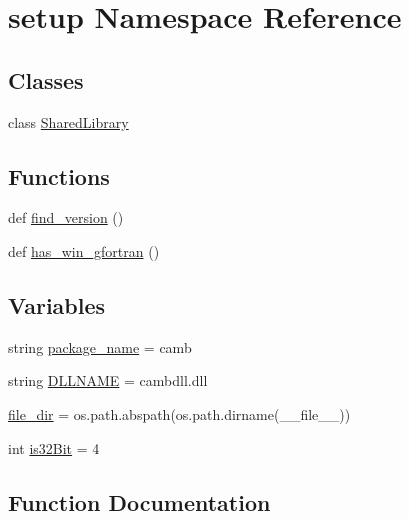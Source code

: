\hypertarget{namespacesetup}{}\section{setup Namespace Reference}
\label{namespacesetup}
\subsection*{Classes}
\begin{DoxyCompactItemize}
\item 
class \mbox{\hyperlink{classsetup_1_1SharedLibrary}{Shared\+Library}}
\end{DoxyCompactItemize}
\subsection*{Functions}
\begin{DoxyCompactItemize}
\item 
def \mbox{\hyperlink{namespacesetup_a81fe34e138f28e550cb579b246bc735e}{find\+\_\+version}} ()
\item 
def \mbox{\hyperlink{namespacesetup_a44ec38f1dccfde84284d2f0ceaa35b69}{has\+\_\+win\+\_\+gfortran}} ()
\end{DoxyCompactItemize}
\subsection*{Variables}
\begin{DoxyCompactItemize}
\item 
string \mbox{\hyperlink{namespacesetup_a3c783d982ab5a3d08b5fcf646a62976d}{package\+\_\+name}} = \textquotesingle{}camb\textquotesingle{}
\item 
string \mbox{\hyperlink{namespacesetup_a26dab225a05128c68178dbb0c6c25d97}{D\+L\+L\+N\+A\+ME}} = \textquotesingle{}cambdll.\+dll\textquotesingle{}
\item 
\mbox{\hyperlink{namespacesetup_ab2a15eb5c273cfb43c44744feeaaf9aa}{file\+\_\+dir}} = os.\+path.\+abspath(os.\+path.\+dirname(\+\_\+\+\_\+file\+\_\+\+\_\+))
\item 
int \mbox{\hyperlink{namespacesetup_a8f95d44fb8dbfbf41cea9ce01742c708}{is32\+Bit}} = 4
\end{DoxyCompactItemize}


\subsection{Function Documentation}
\mbox{\label{namespacesetup_a81fe34e138f28e550cb579b246bc735e}} 
